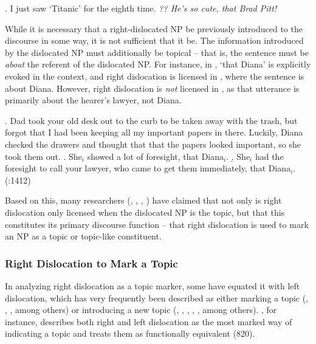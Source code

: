 \documentclass[titlepage,12pt]{article}
\def\infelic{{\leavevmode\llap{\#}}}
\begin{document}
\ex. I just saw `Titanic' for the eighth time. \textit{?? He's so cute, that Brad Pitt!}

\par
While it is necessary that a right-dislocated NP be previously introduced to the discourse in some way, it is not sufficient that it be. The information introduced by the dislocated NP must additionally be topical -- that is, the sentence must be \emph{about} the referent of the dislocated NP. For instance, in \Next, `that Diana' is explicitly evoked in the context, and right dislocation is licensed in \Next[a], where the sentence is about Diana. However, right dislocation is \emph{not} licensed in \Next[b], as that utterance is primarily about the hearer's lawyer, not Diana.

\ex. Dad took your old desk out to the curb to be taken away with the trash, but forgot that I had been keeping all my important papers in there. Luckily, Diana checked the drawers and thought that that the papers looked important, so she took them out. 
\a. She$_i$ showed a lot of foresight, that Diana$_i$.
\b. \infelic She$_i$ had the foresight to call your lawyer, who came to get them immediately, that Diana$_i$.\\
\phantom{x}\hfill (\citealt{huddleston_cambridge_2002}:1412)

Based on this, many researchers (\citealt{davison_syntactic_1984}, \citealt{ziv_right_1994}, \citealt{ziv_left_1994}, \citealt{grosz_centering_1998}) have claimed that not only is right dislocation only licensed when the dislocated NP is the topic, but that this constitutes its primary discourse function -- that right dislocation is used to mark an NP as a topic or topic-like constituent.

\subsubsection{Right Dislocation to Mark a Topic}

In analyzing right dislocation as a topic marker, some have equated it with left dislocation, which has very frequently been described as either marking a topic (\citealt{halliday1967notes}, \citealt{Reinhart1982-REIPAL-2}, \citealt{davison_syntactic_1984}, among others) or introducing a new topic (\citealt{rodman1974left}, \citealt{gundel1988universals}, \citeyear{gundel2004topic}, \citealt{geluykens1992discourse}, \citealt{gregory_topicalization_2001}, among others). \citet{davison_syntactic_1984}, for instance, describes both right and left dislocation as the most marked way of indicating a topic and treats them as functionally equivalent (820). 
\end{document}
